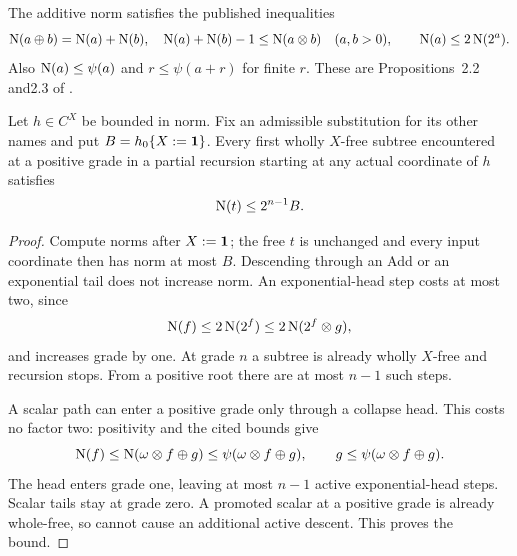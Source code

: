The additive norm satisfies the published inequalities
\[
 \operatorname{N}(a\oplus b)=\operatorname{N}(a)+\operatorname{N}(b),\quad
 \operatorname{N}(a)+\operatorname{N}(b)-1\le\operatorname{N}(a\otimes b)\quad(a,b>0),
 \qquad \operatorname{N}(a)\le2\operatorname{N}(2^a).
\]
Also $\operatorname{N}(a)\le\psi(a)$ and $r\le\psi(a+r)$ for finite $r$.
These are Propositions~2.2 and2.3 of \cite{ww}.

\begin{lemma}\label{wwsc:lem:free}
Let $h\in C^X$ be bounded in norm. Fix an admissible substitution for its other
names and put $B=h_0\{X:=\mathbf1\}$. Every first wholly $X$-free
subtree encountered at a positive grade in a partial recursion starting
at any actual coordinate of $h$ satisfies
\[
 \operatorname{N}(t)\le2^{n-1}B.
\]
\end{lemma}
\begin{proof}
Compute norms after $X:=\mathbf1$; the free $t$ is unchanged and every
input coordinate then has norm at most $B$. Descending through an Add
or an exponential tail does not increase norm. An exponential-head
step costs at most two, since
\[
 \operatorname{N}(f)\le2\operatorname{N}(2^f)\le2\operatorname{N}(2^f\otimes g),
\]
and increases grade by one. At grade $n$ a subtree is already wholly
$X$-free and recursion stops. From a positive root there are at most
$n-1$ such steps.

A scalar path can enter a positive grade only through a collapse head.
This costs no factor two: positivity and the cited bounds give
\[
 \operatorname{N}(f)\le\operatorname{N}(\omega\otimes f\oplus g)
                  \le\psi(\omega\otimes f\oplus g),\qquad
 g\le\psi(\omega\otimes f\oplus g).
\]
The head enters grade one, leaving at most $n-1$ active
exponential-head steps. Scalar tails stay at grade zero. A promoted
scalar at a positive grade is already whole-free, so cannot cause an
additional active descent. This proves the bound.
\end{proof}

